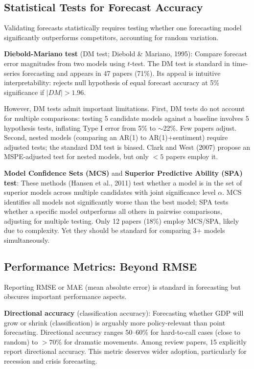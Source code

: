 \documentclass[11pt]{article}
\begin{document}
\subsection{Statistical Tests for Forecast Accuracy}

Validating forecasts statistically requires testing whether one forecasting model significantly outperforms competitors, accounting for random variation.

\textbf{Diebold-Mariano test} (DM test; Diebold \& Mariano, 1995): Compare forecast error magnitudes from two models using $t$-test. The DM test is standard in time-series forecasting and appears in 47 papers (71\%). Its appeal is intuitive interpretability: rejects null hypothesis of equal forecast accuracy at 5\% significance if $|DM| > 1.96$. 

However, DM tests admit important limitations. First, DM tests do not account for multiple comparisons: testing 5 candidate models against a baseline involves 5 hypothesis tests, inflating Type I error from 5\% to $\sim$22\%. Few papers adjust. Second, nested models (comparing an AR(1) to AR(1)+sentiment) require adjusted tests; the standard DM test is biased. Clark and West (2007) propose an MSPE-adjusted test for nested models, but only $<5$ papers employ it.

\textbf{Model Confidence Sets (MCS)} and \textbf{Superior Predictive Ability (SPA) test}: These methods (Hansen et al., 2011) test whether a model is in the set of superior models across multiple candidates with joint significance level $\alpha$. MCS identifies all models not significantly worse than the best model; SPA tests whether a specific model outperforms all others in pairwise comparisons, adjusting for multiple testing. Only 12 papers (18\%) employ MCS/SPA, likely due to complexity. Yet they should be standard for comparing 3+ models simultaneously.

\subsection{Performance Metrics: Beyond RMSE}

Reporting RMSE or MAE (mean absolute error) is standard in forecasting but obscures important performance aspects.

\textbf{Directional accuracy} (classification accuracy): Forecasting whether GDP will grow or shrink (classification) is arguably more policy-relevant than point forecasting. Directional accuracy ranges 50--60\% for hard-to-call cases (close to random) to $>70\%$ for dramatic movements. Among review papers, 15 explicitly report directional accuracy. This metric deserves wider adoption, particularly for recession and crisis forecasting.
\end{document}
